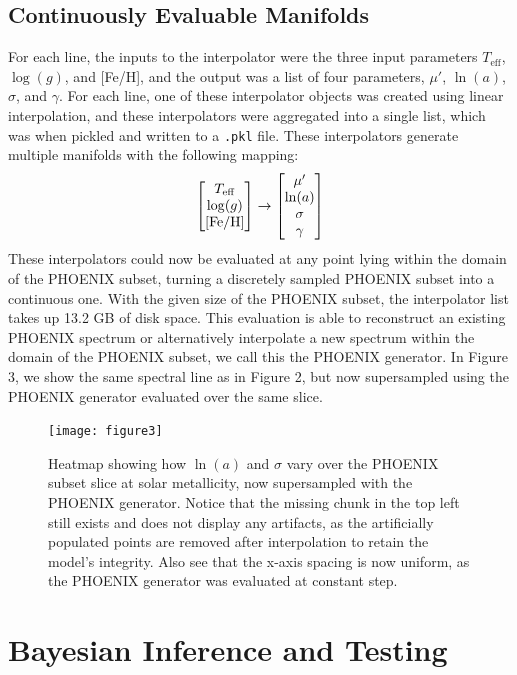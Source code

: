 \documentclass[twocolumn]{aastex631}
\begin{document}
\subsection{Continuously Evaluable Manifolds}
For each line, the inputs to the interpolator were the three input parameters $T_{\mathrm{eff}}$,
$\log(g)$, and [Fe/H], and the output was a list of four parameters, 
$\mu'$, $\ln(a)$, $\sigma$, and $\gamma$. For each line, one of these 
interpolator objects was created using linear interpolation, and these 
interpolators were aggregated into a single list, which was when pickled 
and written to a \texttt{.pkl} file. These interpolators generate multiple 
manifolds with the following mapping:
\begin{gather}
    \mqty[T_{\mathrm{eff}} \\ \log(g) \\ \mathrm{[Fe/H]}] \rightarrow \mqty[\mu' \\ \ln(a) \\ \sigma \\ \gamma]
\end{gather}
These interpolators could now be evaluated at any point lying within the 
domain of the PHOENIX subset, turning a discretely sampled PHOENIX subset 
into a continuous one. With the given size of the PHOENIX subset, the 
interpolator list takes up 13.2 GB of disk space. This evaluation 
is able to reconstruct an existing PHOENIX spectrum or alternatively 
interpolate a new spectrum within the domain of the PHOENIX subset,
we call this the PHOENIX generator. In Figure 3, we show the same 
spectral line as in Figure 2, but now supersampled using the PHOENIX
generator evaluated over the same slice.

\begin{figure}
    \centering
    \texttt{[image: figure3]}
    \caption{Heatmap showing how $\ln(a)$ and $\sigma$ vary over the PHOENIX 
    subset slice at solar metallicity, now supersampled with the PHOENIX 
    generator. Notice that the missing chunk in the top left still exists 
    and does not display any artifacts, as the artificially populated points 
    are removed after interpolation to retain the model's integrity. Also
    see that the x-axis spacing is now uniform, as the PHOENIX generator 
    was evaluated at constant step.}
\end{figure}

\section{Bayesian Inference and Testing}
\end{document}
